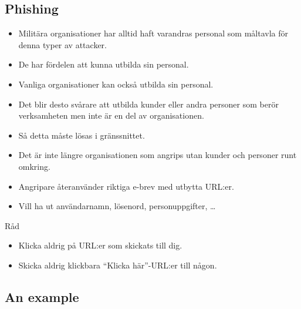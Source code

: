 \documentclass{beamer}
\begin{document}
\subsection{Phishing}

\begin{frame}
  \begin{itemize}
    \item Militära organisationer har alltid haft varandras personal som 
      måltavla för denna typer av attacker.

    \item De har fördelen att kunna utbilda sin personal.

    \item Vanliga organisationer kan också utbilda sin personal.

    \item Det blir desto svårare att utbilda kunder eller andra personer som 
      berör verksamheten men inte är en del av organisationen.

    \item Så detta måste lösas i gränssnittet.

  \end{itemize}
\end{frame}

\begin{frame}
  \begin{itemize}
    \item Det är inte längre organisationen som angrips utan kunder och 
      personer runt omkring.

    \item Angripare återanvänder riktiga e-brev med utbytta URL:er.

    \item Vill ha ut användarnamn, lösenord, personuppgifter, \dots
  \end{itemize}

  \begin{block}{Råd}
    \begin{itemize}
      \item Klicka aldrig på URL:er som skickats till dig.
      \item Skicka aldrig klickbara \enquote{Klicka här}-URL:er till någon.
    \end{itemize}
  \end{block}

\end{frame}

\subsection{An example}
\end{document}
